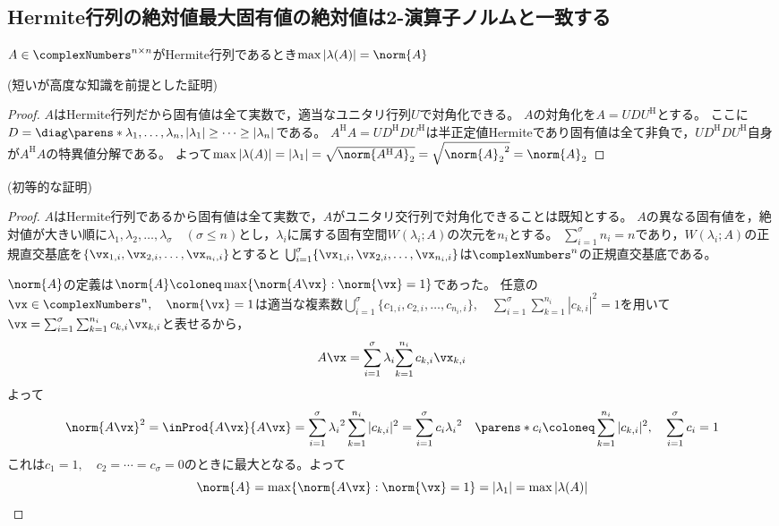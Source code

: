         \subsection{Hermite行列の絶対値最大固有値の絶対値は2-演算子ノルムと一致する}
            \begin{shadebox}
                $A\in\complexNumbers^{n\times n}$がHermite行列であるとき$\max |\lambda(A)| = \norm{A}$
            \end{shadebox}
            \noindent
            (短いが高度な知識を前提とした証明)
            \begin{proof}
                $A$はHermite行列だから固有値は全て実数で，適当なユニタリ行列$U$で対角化できる。
                $A$の対角化を$A = UDU^\mathrm{H}$とする。
                ここに$D = \diag\parens*{\lambda_1,\dotsc,\lambda_n},|\lambda_1| \geq \dotsb \geq |\lambda_n|$である。
                $A^\mathrm{H}A = UD^\mathrm{H}DU^\mathrm{H}$は半正定値Hermiteであり固有値は全て非負で，$UD^\mathrm{H}DU^\mathrm{H}$自身が$A^\mathrm{H}A$の特異値分解である。
                よって$\max |\lambda(A)| = |\lambda_1| = \sqrt{\norm{A^\mathrm{H}A}_2} = \sqrt{{\norm{A}_2}^2} = \norm{A}_2$
            \end{proof}
            \noindent
            (初等的な証明)
            \begin{proof}
                $A$はHermite行列であるから固有値は全て実数で，$A$がユニタリ交行列で対角化できることは既知とする。
                $A$の異なる固有値を，絶対値が大きい順に$\lambda_1,\lambda_2,\dotsc,\lambda_\sigma\quad(\sigma\leq n)$とし，$\lambda_i$に属する固有空間$W(\lambda_i;A)$の次元を$n_i$とする。
                $\sum_{i=1}^{\sigma}{n_i} = n$であり，$W(\lambda_i;A)$の正規直交基底を$\{\vx_{1,i},\vx_{2,i},\dotsc,\vx_{n_i,i}\}$とすると
                $\bigcup_{i=1}^{\sigma}\{\vx_{1,i},\vx_{2,i},\dotsc,\vx_{n_i,i}\}$は$\complexNumbers^n$の正規直交基底である。
                \par
                $\norm{A}$の定義は$\norm{A} \coloneq \max\{\norm{A\vx}:\norm{\vx}=1\}$であった。
                任意の$\vx\in\complexNumbers^n,\quad\norm{\vx}=1$は適当な複素数$\bigcup_{i=1}^{\sigma}\{c_{1,i},c_{2,i},\dotsc,c_{n_i,i}\},\quad\sum_{i=1}^{\sigma}{\sum_{k=1}^{n_i}{|c_{k,i}|^2}}=1$を用いて
                $\vx = \sum_{i=1}^{\sigma}{\sum_{k=1}^{n_i}{c_{k,i}\vx_{k,i}}}$と表せるから，
                \[A\vx = \sum_{i=1}^{\sigma}\lambda_i{\sum_{k=1}^{n_i}{c_{k,i}\vx_{k,i}}}\]
                よって
                \[\norm{A\vx}^2 = \inProd{A\vx}{A\vx} = \sum_{i=1}^{\sigma}{{\lambda_i}^2\sum_{k=1}^{n_i}{|c_{k,i}|^2}} = \sum_{i=1}^{\sigma}{c_i{\lambda_i}^2}\quad\parens*{c_i \coloneq \sum_{k=1}^{n_i}{|c_{k,i}|^2},\quad\sum_{i=1}^{\sigma}{c_i}=1}\]
                これは$c_1=1,\quad c_2=\dotsb=c_\sigma=0$のときに最大となる。よって
                \[\norm{A} = \max\{\norm{A\vx}:\norm{\vx}=1\} = |\lambda_1| = \max |\lambda(A)|\]
            \end{proof}
